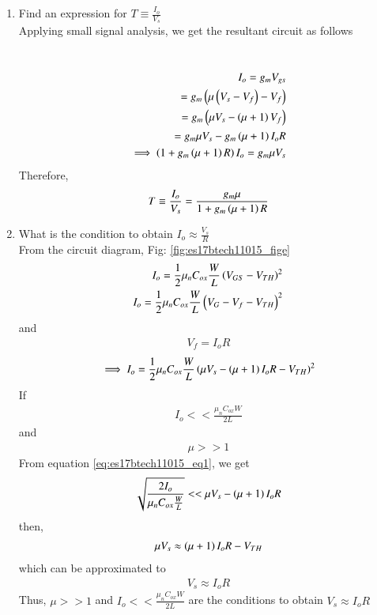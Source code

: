 \begin{enumerate}[label=\arabic*.,ref=\theenumi]
\item Find an expression for $T \equiv \frac{I_o}{V_s}$
\\
\solution  Applying small signal analysis, we get the resultant circuit as follows 
\begin{figure}[ht!]
	\begin{center}
	    \resizebox{\columnwidth/1}{!}{}
	\end{center}
	\caption{}
	\label{fig:es17btech11015_fig2}
\end{figure}\\
\begin{align}
I_o = g_mV_{gs}\\
= g_m\left(\mu\left(V_s-V_f\right)-V_f\right)\\
= g_m\left(\mu V_s-\left(\mu+1\right)V_f\right)\\
= g_m\mu V_s-g_m\left(\mu+1\right)I_oR\\
\implies \left(1+g_m\left(\mu+1\right)R\right)I_o = g_m\mu V_s\\
\end{align}
Therefore,
\begin{align}
    T \equiv \frac{I_o}{V_s} = \frac{g_m\mu}{1+g_m\left(\mu+1\right)R}
\end{align}

\item What is the condition to obtain $I_o\approx\frac{V_s}{R}$\\
\solution
From the circuit diagram, Fig: \ref{fig:es17btech11015_fige}
\begin{align}
    I_o = \frac{1}{2}\mu_nC_{ox}\frac{W}{L}\left(V_{GS}-V_{TH}\right)^2\\
    I_o = \frac{1}{2}\mu_nC_{ox}\frac{W}{L}\left(V_G-V_f-V_{TH}\right)^2
\end{align}
and \begin{align}
    V_f = I_oR
\end{align}
\begin{align}
    \implies I_o = \frac{1}{2}\mu_nC_{ox}\frac{W}{L}\left(\mu V_s-\left(\mu+1\right)I_oR-V_{TH}\right)^2
\label{eq:es17btech11015_eq1}    
\end{align}
If\begin{align}
    I_o << \frac{\mu_nC_{ox}W}{2L}
\end{align} and
\begin{align}
    \mu >> 1
\end{align}
From equation \eqref{eq:es17btech11015_eq1}, we get
\begin{align}
    \sqrt{\frac{2I_o}{\mu_nC_{ox}\frac{W}{L}}} << \mu V_s-\left(\mu+1\right)I_oR\\
\end{align}
then,\begin{align}
    \mu V_s \approx \left(\mu+1\right)I_oR-V_{TH}
\end{align}
which can be approximated to 
\begin{align}
    V_s \approx I_oR
\end{align}
Thus, $\mu>>1$ and $I_o<<\frac{\mu_nC_{ox}W}{2L}$ are the conditions to obtain $V_s \approx I_oR$
% 
\end{enumerate}




